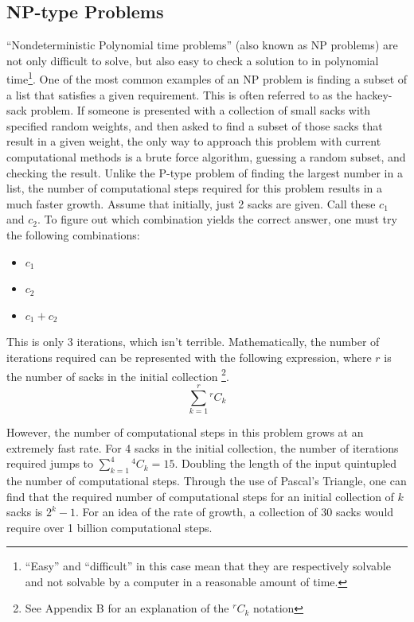 \documentclass[10pt,journal,compsoc]{IEEEtran}
\newcommand*{\Comb}[2]{{}^{#1}C_{#2}}%
\begin{document}
\subsection{NP-type Problems}
 ``Nondeterministic Polynomial time problems'' (also known as NP problems) are not only difficult to solve, but also easy to check a solution to in polynomial time\footnote{``Easy'' and ``difficult'' in this case mean that they are respectively solvable and not solvable by a computer in a reasonable amount of time.}. One of the most common examples of an NP problem is finding a subset of a list that satisfies a given requirement. This is often referred to as the hackey-sack problem. If someone is presented with a collection of small sacks with specified random weights, and then asked to find a subset of those sacks that result in a given weight, the only way to approach this problem with current computational methods is a brute force algorithm, guessing a random subset, and checking the result. Unlike the P-type problem of finding the largest number in a list, the number of computational steps required for this problem results in a much faster growth. Assume that initially, just 2 sacks are given. Call these $c_1$ and $c_2$. To figure out which combination yields the correct answer, one must try the following combinations:
\begin{itemize}
	\item $c_1$
	\item $c_2$
	\item $c_1+c_2$
\end{itemize}
This is only 3 iterations, which isn't terrible. Mathematically, the number of iterations required can be represented with the following expression, where $r$ is the number of sacks in the initial collection \footnote{See Appendix B for an explanation of the $\Comb{r}{k}$ notation}. $$\sum_{k=1}^{r} \Comb{r}{k}$$ 

However, the number of computational steps in this problem grows at an extremely fast rate. For 4 sacks in the initial collection, the number of iterations required jumps to $\sum_{k=1}^{4} \Comb{4}{k} = 15$. Doubling the length of the input quintupled the number of computational steps. Through the use of Pascal's Triangle, one can find that the required number of computational steps for an initial collection of $k$ sacks is $2^k-1$. For an idea of the rate of growth, a collection of 30 sacks would require over 1 billion computational steps. \\
\end{document}
